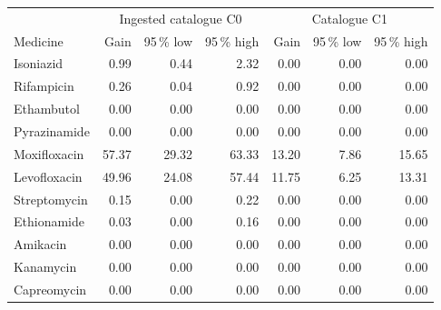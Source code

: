 \begin{tabular}{lrrrrrr}
\toprule
 & \multicolumn{3}{c}{Ingested catalogue C0} & \multicolumn{3}{c}{Catalogue C1} \\
Medicine & Gain & 95\,\% low & 95\,\% high & Gain & 95\,\% low & 95\,\% high \\
\midrule
Isoniazid & 0.99 & 0.44 & 2.32 & 0.00 & 0.00 & 0.00 \\
Rifampicin & 0.26 & 0.04 & 0.92 & 0.00 & 0.00 & 0.00 \\
Ethambutol & 0.00 & 0.00 & 0.00 & 0.00 & 0.00 & 0.00 \\
Pyrazinamide & 0.00 & 0.00 & 0.00 & 0.00 & 0.00 & 0.00 \\
Moxifloxacin & 57.37 & 29.32 & 63.33 & 13.20 & 7.86 & 15.65 \\
Levofloxacin & 49.96 & 24.08 & 57.44 & 11.75 & 6.25 & 13.31 \\
Streptomycin & 0.15 & 0.00 & 0.22 & 0.00 & 0.00 & 0.00 \\
Ethionamide & 0.03 & 0.00 & 0.16 & 0.00 & 0.00 & 0.00 \\
Amikacin & 0.00 & 0.00 & 0.00 & 0.00 & 0.00 & 0.00 \\
Kanamycin & 0.00 & 0.00 & 0.00 & 0.00 & 0.00 & 0.00 \\
Capreomycin & 0.00 & 0.00 & 0.00 & 0.00 & 0.00 & 0.00 \\
\bottomrule
\end{tabular}
